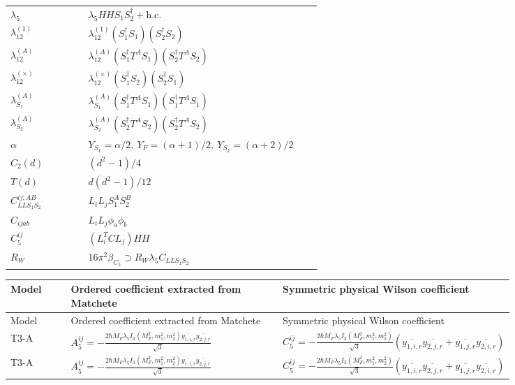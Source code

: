 \documentclass[8pt]{article}
\begin{document}
\begin{landscape}
\begin{longtable}{@{}p{0.23\linewidth}p{0.69\linewidth}@{}}
$\lambda_5$ & $\lambda_5HHS_1S_2^\dagger+\mathrm{h.c.}$ \\
$\lambda_{12}^{(1)}$ & $\lambda_{12}^{(1)}(S_1^\dagger S_1)(S_2^\dagger S_2)$ \\
$\lambda_{12}^{(A)}$ & $\lambda_{12}^{(A)}(S_1^\dagger T^AS_1)(S_2^\dagger T^AS_2)$ \\
$\lambda_{12}^{(\times)}$ & $\lambda_{12}^{(\times)}(S_1^\dagger S_2)(S_2^\dagger S_1)$ \\
$\lambda_{S_1}^{(A)}$ & $\lambda_{S_1}^{(A)}(S_1^\dagger T^A S_1)(S_1^\dagger T^A S_1)$ \\
$\lambda_{S_2}^{(A)}$ & $\lambda_{S_2}^{(A)}(S_2^\dagger T^A S_2)(S_2^\dagger T^A S_2)$ \\
$\alpha$ & $Y_{S_1}=\alpha/2,\ Y_F=(\alpha+1)/2,\ Y_{S_2}=(\alpha+2)/2$ \\
$C_2(d)$ & $(d^2-1)/4$ \\
$T(d)$ & $d(d^2-1)/12$ \\
$C_{LLS_1S_2}^{ij;AB}$ & $L_iL_jS_1^AS_2^B$ \\
$C_{ijab}$ & $L_iL_j\phi_a\phi_b$ \\
$C_5^{ij}$ & $(L_i^TCL_j)HH$ \\
$R_W$ & $16\pi^2\beta_{C_5}\supset R_W\lambda_5C_{LLS_1S_2}$ \\
\bottomrule
\end{longtable}
\scriptsize
\begin{longtable}{@{}l >{\raggedright\arraybackslash}p{0.42\linewidth} >{\raggedright\arraybackslash}p{0.42\linewidth}@{}}
\toprule
Model & Ordered coefficient extracted from Matchete & Symmetric physical Wilson coefficient \\
\midrule
\endfirsthead
\toprule
Model & Ordered coefficient extracted from Matchete & Symmetric physical Wilson coefficient \\
\midrule
\endhead
T3-A & \(\displaystyle A_5^{ij}=-\frac{2 \hbar  M_F \lambda_5 I_3\left(M_F^2,m_1^2,m_2^2\right) \overline{y_{1,i,r}} \overline{y_{2,j,r}}}{\sqrt{3}}\) & \(\displaystyle C_5^{ij}=-\frac{2 \hbar  M_F \lambda_5 I_3\left(M_F^2,m_1^2,m_2^2\right) }{\sqrt{3}}\left(\overline{y_{1,i,r}} \overline{y_{2,j,r}}+\overline{y_{1,j,r}} \overline{y_{2,i,r}}\right)\) \\
\midrule
T3-A & \(\displaystyle A_5^{ij}=-\frac{2 \hbar  M_F \lambda_5 I_3\left(M_F^2,m_1^2,m_2^2\right) \overline{y_{1,i,r}} \overline{y_{2,j,r}}}{\sqrt{3}}\) & \(\displaystyle C_5^{ij}=-\frac{2 \hbar  M_F \lambda_5 I_3\left(M_F^2,m_1^2,m_2^2\right) }{\sqrt{3}}\left(\overline{y_{1,i,r}} \overline{y_{2,j,r}}+\overline{y_{1,j,r}} \overline{y_{2,i,r}}\right)\) \\

\end{longtable}
\end{landscape}
\end{document}
